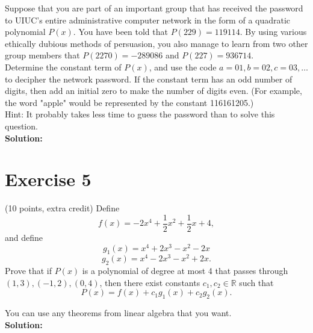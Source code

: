 \documentclass{article}
\begin{document}
Suppose that you are part of an important group that has received the password to UIUC's entire administrative computer network in the form of a quadratic polynomial $P(x)$. You have been told that $P(229) = 119114$. By using various ethically dubious methods of persuasion, you also manage to learn from two other group members that $P(2270) = -289086$ and $P(227) = 936714$. \\

Determine the constant term of $P(x)$, and use the code $a = 01, b = 02, c = 03, \ldots$ to decipher the network password. If the constant term has an odd number of digits, then add an initial zero to make the number of digits even. (For example, the word "apple" would be represented by the constant 116161205.) \\

Hint: It probably takes less time to guess the password than to solve this question. \\

\textbf{Solution:} \\



\newpage

\section*{Exercise 5}
(10 points, extra credit) Define
\[
f(x) = -2x^4 + \frac{1}{2}x^2 + \frac{1}{2}x + 4,
\]
and define
\[
g_1(x) = x^4 + 2x^3 - x^2 - 2x
\]
\[
g_2(x) = x^4 - 2x^3 - x^2 + 2x.
\]
Prove that if $P(x)$ is a polynomial of degree at most 4 that passes through $(1,3), (-1,2), (0,4)$, then there exist constants $c_1, c_2 \in \mathbb{R}$ such that
\[
P(x) = f(x) + c_1 g_1(x) + c_2 g_2(x).
\]

You can use any theorems from linear algebra that you want. \\

\textbf{Solution:} \\
\end{document}
